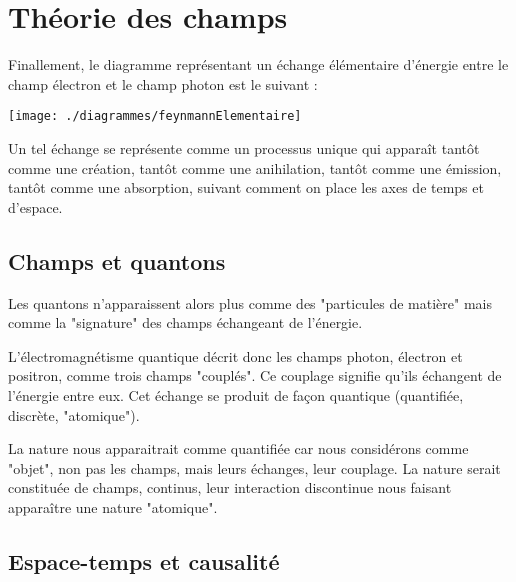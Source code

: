 

\section{Théorie des champs}



Finallement, le diagramme représentant un échange élémentaire d'énergie entre le champ électron et le champ photon est le suivant :

\begin{center}
\texttt{[image: ./diagrammes/feynmannElementaire]}
\end{center}

Un tel échange se représente comme un processus unique qui apparaît tantôt comme une création, tantôt comme une anihilation, tantôt comme une émission, tantôt comme une absorption, suivant comment on place les axes de temps et d'espace.


\subsection{Champs et quantons}

Les quantons n'apparaissent alors plus comme des "particules de matière" mais comme la "signature" des champs échangeant de l'énergie.

L'électromagnétisme quantique décrit donc les champs photon, électron et positron, comme trois champs "couplés". Ce couplage signifie qu'ils échangent de l'énergie entre eux. Cet échange se produit de façon quantique (quantifiée, discrète, "atomique").

La nature nous apparaitrait comme quantifiée car nous considérons comme "objet", non pas les champs, mais leurs échanges, leur couplage. La nature serait constituée de champs, continus, leur interaction discontinue nous faisant apparaître une nature "atomique".  

\subsection{Espace-temps et causalité}

